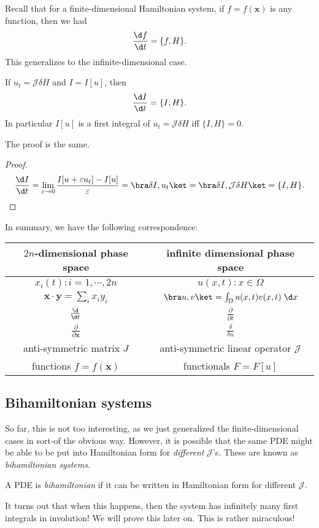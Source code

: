 \documentclass[a4paper]{article}
\begin{document}
Recall that for a finite-dimensional Hamiltonian system, if $f = f(\mathbf{x})$ is any function, then we had
\[
  \frac{\d f}{\d t} = \{f, H\}.
\]
This generalizes to the infinite-dimensional case.
\begin{prop}
  If $u_t = \mathcal{J} \delta H$ and $I = I[u]$, then
  \[
    \frac{\d I}{\d t} = \{I, H\}.
  \]
  In particular $I[u]$ is a first integral of $u_t = \mathcal{J} \delta H$ iff $\{I, H\} = 0$.
\end{prop}

The proof is the same.
\begin{proof}
  \[
    \frac{\d I}{\d t} = \lim_{\varepsilon \to 0} \frac{I[u + \varepsilon u_t] - I[u]}{\varepsilon} = \bra \delta I, u_t\ket = \bra \delta I, \mathcal{J}\delta H\ket = \{I, H\}.\qedhere
  \]
\end{proof}

In summary, we have the following correspondence:
\begin{center}
  \begin{tabular}{cc}
    \toprule
    $2n$-dimensional phase space & infinite dimensional phase space\\
    \midrule
    $x_i(t): i = 1, \cdots, 2n$ & $u(x, t): x \in \Omega$\\
    $\mathbf{x}\cdot\mathbf{y} = \sum_i x_i y_i$ & $\bra u, v \ket = \int_\Omega u(x, t) v(x, t) \;\d x$\\
    $\frac{\d}{\d t}$ & $\frac{\partial}{\partial t}$\\
    $\frac{\partial}{\partial \mathbf{x}}$ & $\frac{\delta}{\delta u}$\\
    anti-symmetric matrix $J$ & anti-symmetric linear operator $\mathcal{J}$ \\
    functions $f = f(\mathbf{x})$ & functionals $F = F[u]$\\
    \bottomrule
  \end{tabular}
\end{center}


\subsection{Bihamiltonian systems}
So far, this is not too interesting, as we just generalized the finite-dimensional cases in sort-of the obvious way. However, it is possible that the same PDE might be able to be put into Hamiltonian form for \emph{different} $\mathcal{J}$'s. These are known as \emph{bihamiltonian systems}.
\begin{defi}
  A PDE is \emph{bihamiltonian} if it can be written in Hamiltonian form for different $\mathcal{J}$.
\end{defi}
It turns out that when this happens, then the system has infinitely many first integrals in involution! We will prove this later on. This is rather miraculous!
\end{document}
